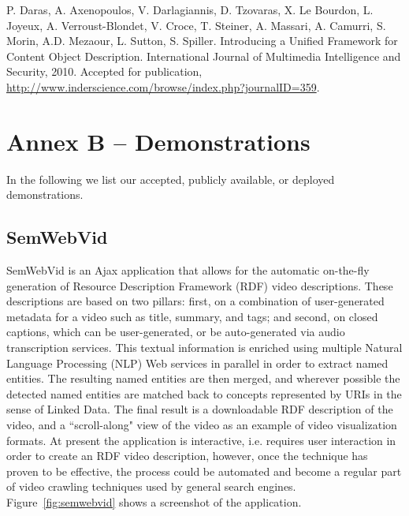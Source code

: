 \documentclass[12pt]{article}
\begin{document}
\noindent P. Daras, A. Axenopoulos, V. Darlagiannis, D. Tzovaras, X. Le Bourdon, L. Joyeux, A. Verroust-Blondet, V. Croce, T. Steiner, A. Massari, A. Camurri, S. Morin, A.D. Mezaour, L. Sutton, S. Spiller. Introducing a Unified Framework for Content Object Description. International Journal of Multimedia Intelligence and Security, 2010. Accepted for publication, \url{http://www.inderscience.com/browse/index.php?journalID=359}.

\pagebreak
\section{Annex B -- Demonstrations}
In the following we list our accepted, publicly available, or deployed demonstrations.

\subsection{SemWebVid} \label{sec:semwebvid}
SemWebVid is an Ajax application that allows for the automatic on-the-fly generation of Resource Description Framework (RDF) video descriptions. These descriptions are based on two pillars: first, on a combination of user-generated metadata for a video such as title, summary, and tags; and second, on closed captions, which can be user-generated, or be auto-generated via audio transcription services. This textual information is enriched using multiple Natural Language Processing (NLP) Web services in parallel in order to extract named entities. The resulting named entities are then merged, and wherever possible the detected named entities are matched back to concepts represented by URIs in the sense of Linked Data. The final result is a downloadable RDF description of the video, and a ``scroll-along" view of the video as an example of video visualization formats. At present the application is interactive, i.e. requires user interaction in order to create an RDF video description, however, once the technique has proven to be effective, the process could be automated and become a regular part of video crawling techniques used by general search engines. Figure~\ref{fig:semwebvid} shows a screenshot of the application.
\end{document}
